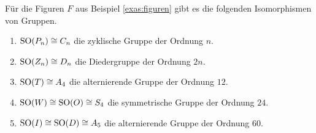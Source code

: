 \documentclass{book}
\begin{document}
\begin{prop}
    \label{prop:sym}
    Für die Figuren $F$ aus Beispiel \ref{exas:figuren} gibt es die folgenden Isomorphismen von Gruppen.
    \begin{enumerate}
        \item\label{it:sym1} ${\operatorname{SO}}(P_n) \cong C_n$ die zyklische Gruppe der Ordnung $n$.
        \item\label{it:sym2} ${\operatorname{SO}}(Z_n) \cong D_n$ die Diedergruppe der Ordnung $2n$.
        \item\label{it:sym3} ${\operatorname{SO}}(T) \cong A_4$ die alternierende Gruppe der Ordnung $12$.
        \item\label{it:sym4} ${\operatorname{SO}}(W) \cong {\operatorname{SO}}(O) \cong S_4$ die symmetrische Gruppe der Ordnung $24$. 
        \item\label{it:sym5} ${\operatorname{SO}}(I) \cong {\operatorname{SO}}(D) \cong A_5$ die alternierende Gruppe der Ordnung $60$. 
    \end{enumerate}
\end{prop}
\end{document}
